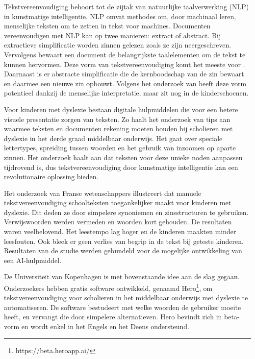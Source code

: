 Tekstvereenvoudiging behoort tot de zijtak van natuurlijke taalverwerking (NLP) in kunstmatige intelligentie. NLP omvat methodes om, door machinaal leren, menselijke teksten om te zetten in tekst voor machines. Documenten vereenvoudigen met NLP kan op twee manieren: extract of abstract. Bij extractieve simplificatie worden zinnen gelezen zoals ze zijn neergeschreven. Vervolgens bewaart een document de belangrijkste taalelementen om de tekst te kunnen hervormen. Deze vorm van tekstvereenvoudiging komt het meeste voor \autocite{Sciforce2020}. Daarnaast is er abstracte simplificatie die de kernboodschap van de zin bewaart en daarmee een nieuwe zin opbouwt. Volgens het onderzoek van \textcite{Chowdhary2020} heeft deze vorm potentieel dankzij de menselijke interpretatie, maar zit nog in de kinderschoenen.

Voor kinderen met dyslexie bestaan digitale hulpmiddelen die voor een betere visuele presentatie zorgen van teksten. Zo haalt het onderzoek van \textcite{Rello2012} tips aan waarmee teksten en documenten rekening moeten houden bij scholieren met dyslexie in het derde graad middelbaar onderwijs. Het gaat over speciale lettertypes, spreiding tussen woorden en het gebruik van inzoomen op aparte zinnen. Het onderzoek haalt aan dat teksten voor deze unieke noden aanpassen tijdrovend is, dus tekstvereenvoudiging door kunstmatige intelligentie kan een revolutionaire oplossing bieden. 

Het onderzoek van Franse wetenschappers \newline \textcite{Gala2016} illustreert dat manuele tekstvereenvoudiging schoolteksten toegankelijker \newline maakt voor kinderen met dyslexie. Dit deden ze door simpelere synoniemen en zinsstructuren te gebruiken. Verwijswoorden werden vermeden en woorden kort gehouden. De resultaten waren veelbelovend. Het leestempo lag hoger en de kinderen maakten minder leesfouten. Ook bleek er geen verlies van begrip in de tekst bij geteste kinderen. Resultaten van de studie werden gebundeld voor de mogelijke ontwikkeling van een AI-hulpmiddel.

De Universiteit van Kopenhagen is met bovenstaande idee aan de slag gegaan. Onderzoekers \textcite{Bingel2018} hebben gratis software ontwikkeld, genaamd Hero\footnote{https://beta.heroapp.ai/}, om tekstvereenvoudiging voor scholieren in het middelbaar onderwijs met dyslexie te automatiseren. De software bestudeert met welke woorden de gebruiker moeite heeft, en vervangt die door simpelere alternatieven. Hero bevindt zich in beta-vorm en wordt enkel in het Engels en het Deens ondersteund. 

